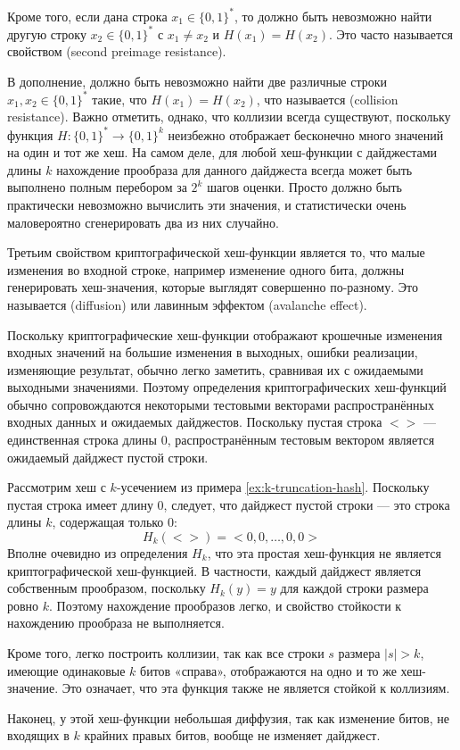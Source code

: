 Кроме того, если дана строка $x_1\in\{0,1\}^*$, то должно быть невозможно найти другую строку $x_2\in\{0,1\}^*$ с $x_1\neq x_2$ и $H(x_1)=H(x_2)$. Это часто называется свойством  (second preimage resistance).

В дополнение, должно быть невозможно найти две различные строки $x_1,x_2 \in\{0,1\}^*$ такие, что $H(x_1)=H(x_2)$, что называется  (collision resistance). Важно отметить, однако, что коллизии всегда существуют, поскольку функция $H: \{0,1\}^* \to \{0,1\}^k$ неизбежно отображает бесконечно много значений на один и тот же хеш. На самом деле, для любой хеш-функции с дайджестами длины $k$ нахождение прообраза для данного дайджеста всегда может быть выполнено полным перебором за $2^k$ шагов оценки. Просто должно быть практически невозможно вычислить эти значения, и статистически очень маловероятно сгенерировать два из них случайно.

Третьим свойством криптографической хеш-функции является то, что малые изменения во входной строке, например изменение одного бита, должны генерировать хеш-значения, которые выглядят совершенно по-разному. Это называется  (diffusion) или лавинным эффектом (avalanche effect).

Поскольку криптографические хеш-функции отображают крошечные изменения входных значений на большие изменения в выходных, ошибки реализации, изменяющие результат, обычно легко заметить, сравнивая их с ожидаемыми выходными значениями. Поэтому определения криптографических хеш-функций обычно сопровождаются некоторыми тестовыми векторами распространённых входных данных и ожидаемых дайджестов. Поскольку пустая строка $<>$ — единственная строка длины $0$, распространённым тестовым вектором является ожидаемый дайджест пустой строки.
\begin{example} Рассмотрим хеш с $k$-усечением из примера \ref{ex:k-truncation-hash}. Поскольку пустая строка имеет длину $0$, следует, что дайджест пустой строки — это строка длины $k$, содержащая только $0$:
\begin{equation}
H_k(<>)= <0,0,\ldots, 0,0>
\end{equation}
Вполне очевидно из определения $H_k$, что эта простая хеш-функция не является криптографической хеш-функцией. В частности, каждый дайджест является собственным прообразом, поскольку $H_k(y)=y$ для каждой строки размера ровно $k$. Поэтому нахождение прообразов легко, и свойство стойкости к нахождению прообраза не выполняется.

Кроме того, легко построить коллизии, так как все строки $s$ размера $|s|>k$, имеющие одинаковые $k$ битов «справа», отображаются на одно и то же хеш-значение. Это означает, что эта функция также не является стойкой к коллизиям.

Наконец, у этой хеш-функции небольшая диффузия, так как изменение битов, не входящих в $k$ крайних правых битов, вообще не изменяет дайджест.
\end{example}

